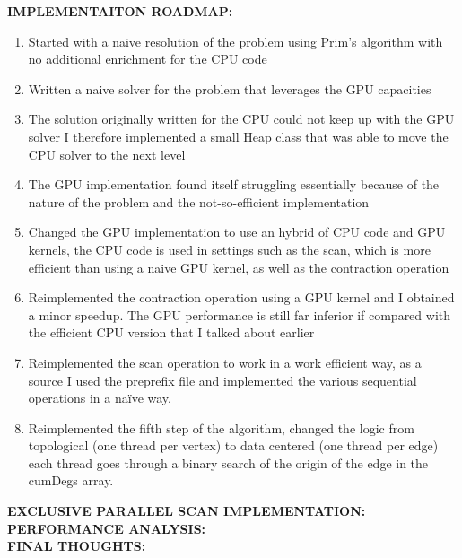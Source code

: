 \documentclass[a4paper,10pt]{article}
\begin{document}
\bigskip
{}
\makeatletter{}\makeatother
\label{sec:implementation-roadmap}
\noindent
\textbf{IMPLEMENTAITON ROADMAP:}
\\
\begin{enumerate}
	\item Started with a naive resolution of the problem using Prim's algorithm with no additional enrichment for the CPU code
	\item Written a naive solver for the problem that leverages the GPU capacities
	\item The solution originally written for the CPU could not keep up with the GPU solver I therefore implemented a small Heap class that was able to move the CPU solver to the next level
	\item The GPU implementation found itself struggling essentially because of the nature of the problem and the not-so-efficient implementation
	\item Changed the GPU implementation to use an hybrid of CPU code and GPU kernels, the CPU code is used in settings such as the scan, which is more efficient than using a naive GPU kernel, as well as the contraction operation
	\item Reimplemented the contraction operation using a GPU kernel and I obtained a minor speedup. The GPU performance is still far inferior if compared with the efficient CPU version that I talked about earlier
	\item Reimplemented the scan operation to work in a work efficient way, as a source I used the preprefix file and implemented the various sequential operations in a naïve way.
	\item Reimplemented the fifth step of the algorithm, changed the logic from topological (one thread per vertex) to data centered (one thread per edge) each thread goes through a binary search of the origin of the edge in the cumDegs array.
\end{enumerate}

\bigskip
{}
\makeatletter{}\makeatother
\label{sec:parallel-scan}
\noindent
\textbf{EXCLUSIVE PARALLEL SCAN IMPLEMENTATION:}
\\

\bigskip
{}
\makeatletter\def\@currentlabel{\texttt{(III)}}\makeatother
\label{sec:performance-analysis}
\noindent
\textbf{PERFORMANCE ANALYSIS:}
\\

\bigskip
{}
\makeatletter\def\@currentlabel{\texttt{(IV)}}\makeatother
\label{sec:final-thoughts}
\noindent
\textbf{FINAL THOUGHTS:}
\\

\clearpage

\printbibliography
\end{document}
